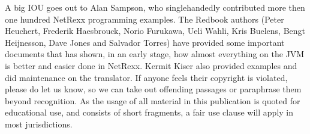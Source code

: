 A big IOU goes out to Alan Sampson, who singlehandedly contributed more then one hundred NetRexx programming examples. The Redbook authors (Peter Heuchert, Frederik Haesbrouck, Norio Furukawa, Ueli Wahli, Kris Buelens, Bengt Heijnesson, Dave Jones and Salvador Torres) have provided some important documents that has shown, in an early stage, how almost everything on the JVM is better and easier done in NetRexx. Kermit Kiser also provided examples and did maintenance on the translator. If anyone feels their copyright is violated, please do let us know, so we can take out offending passages or paraphrase them beyond recognition. As the usage of all material in this publication is quoted for educational use, and consists of short fragments, a fair use clause will apply in most jurisdictions.

